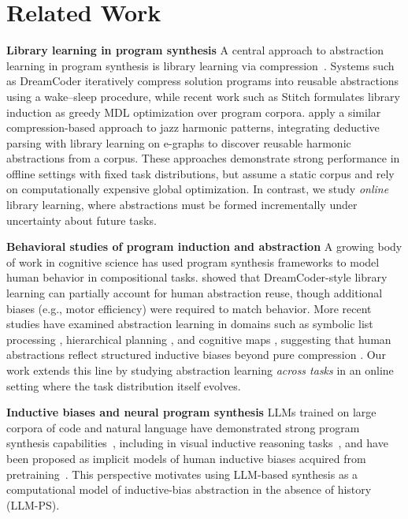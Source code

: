 \documentclass{article}
\begin{document}
\section{Related Work}

\textbf{Library learning in program synthesis}
A central approach to abstraction learning in program synthesis is library learning via compression~\cite{liang2010learning,allamanis2018mining,shin2019program,grand2024lilo}. Systems such as DreamCoder \citep{ellis2023dreamcoder} iteratively compress solution programs into reusable abstractions using a wake--sleep procedure, while recent work such as Stitch \citep{bowers2023top} formulates library induction as greedy MDL optimization over program corpora. \citet{ren2026library} apply a similar compression-based approach to jazz harmonic patterns, integrating deductive parsing with library learning on e-graphs to discover reusable harmonic abstractions from a corpus. These approaches demonstrate strong performance in offline settings with fixed task distributions, but assume a static corpus and rely on computationally expensive global optimization. In contrast, we study \emph{online} library learning, where abstractions must be formed incrementally under uncertainty about future tasks.

\textbf{Behavioral studies of program induction and abstraction}
A growing body of work in cognitive science has used program synthesis frameworks to model human behavior in compositional tasks. \citet{tian2020learning} showed that DreamCoder-style library learning can partially account for human abstraction reuse, though additional biases (e.g., motor efficiency) were required to match behavior. More recent studies have examined abstraction learning in domains such as symbolic list processing \citep{rule2024symbolic,ham2025teaching}, hierarchical planning \citep{qin2025planning, correa2025exploring}, and cognitive maps \citep{sharma2022mapi, kryven2025cognitive}, suggesting that human abstractions reflect structured inductive biases beyond pure compression \citep{he2025bootstrapping}. Our work extends this line by studying abstraction learning \emph{across tasks} in an online setting where the task distribution itself evolves.

\textbf{Inductive biases and neural program synthesis}
LLMs trained on large corpora of code and natural language have demonstrated strong program synthesis capabilities~\citep{chen2021evaluating, austin2021program}, including in visual inductive reasoning tasks~\citep{acquaviva2022communicating, wang2023hypothesis}, and have been proposed as implicit models
of human inductive biases acquired from pretraining~\citep{binz2025foundation,
kryven2025cognitive}. This perspective motivates using LLM-based
synthesis as a computational model of inductive-bias
abstraction in the absence of history (LLM-PS). 
\end{document}

